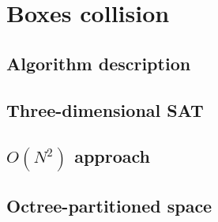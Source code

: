 \chapter{Boxes collision}
\label{cha:boxescollision}

\section{Algorithm description}
\label{sec:boxesalgorithmdescription}

\section{Three-dimensional SAT}

\section{{$O(N^2)$} approach}
\label{sec:boxesinitial}

\section{Octree-partitioned space}
\label{sec:boxesoctree}
